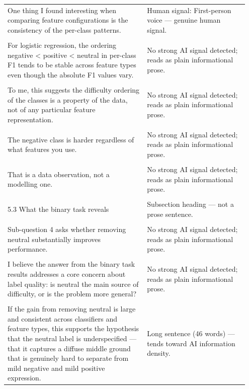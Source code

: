 \documentclass[11pt]{article}
\begin{document}
\begin{longtable}{|p{0.55\linewidth}|p{0.40\linewidth}|}
\hline
\rule{0pt}{3.5cm} & \\
\hline
One thing I found interesting when comparing feature configurations is the consistency of the per-class patterns. & Human signal: First-person voice --- genuine human signal. \\[2pt]
\hline
\rule{0pt}{3.5cm} & \\
\hline
For logistic regression, the ordering negative < positive < neutral in per-class F1 tends to be stable across feature types even though the absolute F1 values vary. & No strong AI signal detected; reads as plain informational prose. \\[2pt]
\hline
\rule{0pt}{3.5cm} & \\
\hline
To me, this suggests the difficulty ordering of the classes is a property of the data, not of any particular feature representation. & No strong AI signal detected; reads as plain informational prose. \\[2pt]
\hline
\rule{0pt}{3.5cm} & \\
\hline
The negative class is harder regardless of what features you use. & No strong AI signal detected; reads as plain informational prose. \\[2pt]
\hline
\rule{0pt}{3.5cm} & \\
\hline
That is a data observation, not a modelling one. & No strong AI signal detected; reads as plain informational prose. \\[2pt]
\hline
\rule{0pt}{3.5cm} & \\
\hline
5.3 What the binary task reveals & Subsection heading --- not a prose sentence. \\[2pt]
\hline
\rule{0pt}{3.5cm} & \\
\hline
Sub-question 4 asks whether removing neutral substantially improves performance. & No strong AI signal detected; reads as plain informational prose. \\[2pt]
\hline
\rule{0pt}{3.5cm} & \\
\hline
I believe the answer from the binary task results addresses a core concern about label quality: is neutral the main source of difficulty, or is the problem more general? & No strong AI signal detected; reads as plain informational prose. \\[2pt]
\hline
\rule{0pt}{3.5cm} & \\
\hline
If the gain from removing neutral is large and consistent across classifiers and feature types, this supports the hypothesis that the neutral label is underspecified --- that it captures a diffuse middle ground that is genuinely hard to separate from mild negative and mild positive expression. & Long sentence (46 words) --- tends toward AI information density. \\[2pt]

\end{longtable}
\end{document}
